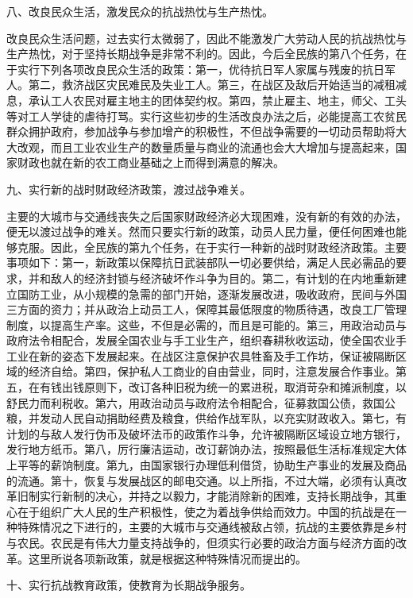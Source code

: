 八、改良民众生活，激发民众的抗战热忱与生产热忱。

改良民众生活问题，过去实行太微弱了，因此不能激发广大劳动人民的抗战热忱与生产热忱，对于坚持长期战争是非常不利的。因此，今后全民族的第八个任务，在于实行下列各项改良民众生活的政策：第一，优待抗日军人家属与残废的抗日军人。第二，救济战区灾民难民及失业工人。第三，在战区及敌后开始适当的减租减息，承认工人农民对雇主地主的团体契约权。第四，禁止雇主、地主，师父、工头等对工人学徒的虐待打骂。实行这些初步的生活改良办法之后，必能提高工农贫民群众拥护政府，参加战争与参加增产的积极性，不但战争需要的一切动员帮助将大大改观，而且工业农业生产的数量质量与商业的流通也会大大增加与提高起来，国家财政也就在新的农工商业基础之上而得到满意的解决。

九、实行新的战时财政经济政策，渡过战争难关。

主要的大城市与交通线丧失之后国家财政经济必大现困难，没有新的有效的办法，便无以渡过战争的难关。然而只要实行新的政策，动员人民力量，便任何困难也能够克服。因此，全民族的第九个任务，在于实行一种新的战时财政经济政策。主要事项如下：第一，新政策以保障抗日武装部队一切必要供给，满足人民必需品的要求，并和敌人的经济封锁与经济破坏作斗争为目的。第二，有计划的在内地重新建立国防工业，从小规模的急需的部门开始，逐渐发展改进，吸收政府，民间与外国三方面的资力；并从政治上动员工人，保障其最低限度的物质待遇，改良工厂管理制度，以提高生产率。这些，不但是必需的，而且是可能的。第三，用政治动员与政府法令相配合，发展全国农业与手工业生产，组织春耕秋收运动，使全国农业手工业在新的姿态下发展起来。在战区注意保护农具牲畜及手工作坊，保证被隔断区域的经济自给。第四，保护私人工商业的自由营业，同时，注意发展合作事业。第五，在有钱出钱原则下，改订各种旧税为统一的累进税，取消苛杂和摊派制度，以舒民力而利税收。第六，用政治动员与政府法令相配合，征募救国公债，救国公粮，并发动人民自动捐助经费及粮食，供给作战军队，以充实财政收入。第七，有计划的与敌人发行伪币及破坏法币的政策作斗争，允许被隔断区域设立地方银行，发行地方纸币。第八，厉行廉洁运动，改订薪饷办法，按照最低生活标准规定大体上平等的薪饷制度。第九，由国家银行办理低利借贷，协助生产事业的发展及商品的流通。第十，恢复与发展战区的邮电交通。以上所指，不过大端，必须有认真改革旧制实行新制的决心，并持之以毅力，才能消除新的困难，支持长期战争，其重心在于组织广大人民的生产积极性，使之为着战争供给而效力。中国的抗战是在一种特殊情况之下进行的，主要的大城市与交通线被敌占领，抗战的主要依靠是乡村与农民。农民是有伟大力量支持战争的，但须实行必要的政治方面与经济方面的改革。这里所说各项新政策，就是根据这种特殊情况而提出的。

十、实行抗战教育政策，使教育为长期战争服务。

